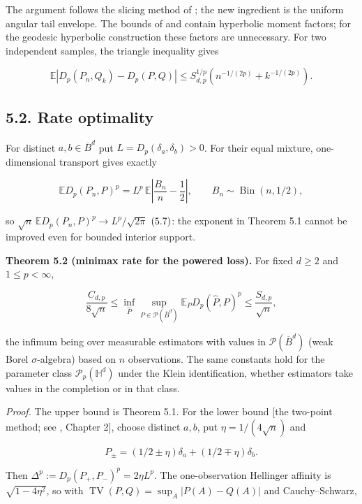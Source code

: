 \documentclass[
  british,
  11pt,
  a4paper,
]{article}
\begin{document}
The argument follows the slicing method of \citet{Nadjahi2020}; the new
ingredient is the uniform angular tail envelope. The bounds of
\citet[Proposition B.6]{Bonet2023} and \citet[Proposition 29]{BDC2025}
contain hyperbolic moment factors; for the geodesic hyperbolic
construction these factors are unnecessary. For two independent samples,
the triangle inequality gives

\[
\mathbb E|D_p(P_n,Q_k)-D_p(P,Q)|
\leq S_{d,p}^{1/p}(n^{-1/(2p)}+k^{-1/(2p)}).
\tag{5.5}
\]

\subsection{5.2. Rate optimality}\label{rate-optimality}

For distinct \(a,b\in\overline B^d\) put \(L=D_p(\delta_a,\delta_b)>0\).
For their equal mixture, one-dimensional transport gives exactly

\[
\mathbb E D_p(P_n,P)^p
=L^p\,\mathbb E\left|\frac{B_n}{n}-\frac12\right|,
\qquad B_n\sim\operatorname{Bin}(n,1/2),
\tag{5.6}
\]

so \(\sqrt n\,\mathbb E D_p(P_n,P)^p\to L^p/\sqrt{2\pi}\)
\(\hfill(5.7)\): the exponent in Theorem 5.1 cannot be improved even for
bounded interior support.

\textbf{Theorem 5.2 (minimax rate for the powered loss).} For fixed
\(d\geq2\) and \(1\leq p<\infty\),

\[
\frac{C_{d,p}}{8\sqrt n}\leq
\inf_{\widehat P}\sup_{P\in\mathcal P(\overline B^d)}
\mathbb E_P D_p(\widehat P,P)^p
\leq\frac{S_{d,p}}{\sqrt n},
\tag{5.8}
\]

the infimum being over measurable estimators with values in
\(\mathcal P(\overline B^d)\) (weak Borel \(\sigma\)-algebra) based on
\(n\) observations. The same constants hold for the parameter class
\(\mathcal P_p(\mathbb H^d)\) under the Klein identification, whether
estimators take values in the completion or in that class.

\emph{Proof.} The upper bound is Theorem 5.1. For the lower bound {[}the
two-point method; see \citet{Tsybakov2009}, Chapter 2{]}, choose
distinct \(a,b\), put \(\eta=1/(4\sqrt n)\) and

\[
P_\pm=(1/2\pm\eta)\delta_a+(1/2\mp\eta)\delta_b .
\]

Then \(\Delta^p:=D_p(P_+,P_-)^p=2\eta L^p\). The one-observation
Hellinger affinity is \(\sqrt{1-4\eta^2}\), so with
\(\operatorname{TV}(P,Q)=\sup_A|P(A)-Q(A)|\) and Cauchy--Schwarz,
\end{document}
